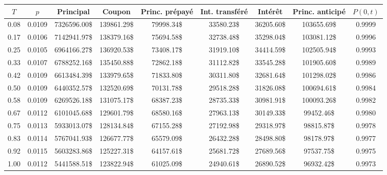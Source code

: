 \begin{tabular}{ccccccccc}
\toprule
       $T$ &          $p$ &          Principal &            Coupon &   Princ. prépayé &   Int. transféré &          Intérêt &   Princ. anticipé &     $P(0,t)$ \\
\midrule
\num{0.08} & \num{0.0109} & \num{7326596.00}\$ & \num{139861.29}\$ & \num{79998.34}\$ & \num{33580.23}\$ & \num{36205.60}\$ & \num{103655.69}\$ & \num{0.9999} \\
\num{0.17} & \num{0.0106} & \num{7142941.97}\$ & \num{138379.16}\$ & \num{75694.58}\$ & \num{32738.48}\$ & \num{35298.04}\$ & \num{103081.12}\$ & \num{0.9996} \\
\num{0.25} & \num{0.0105} & \num{6964166.27}\$ & \num{136920.53}\$ & \num{73408.17}\$ & \num{31919.10}\$ & \num{34414.59}\$ & \num{102505.94}\$ & \num{0.9993} \\
\num{0.33} & \num{0.0107} & \num{6788252.16}\$ & \num{135450.88}\$ & \num{72862.18}\$ & \num{31112.82}\$ & \num{33545.28}\$ & \num{101905.60}\$ & \num{0.9989} \\
\num{0.42} & \num{0.0109} & \num{6613484.39}\$ & \num{133979.65}\$ & \num{71833.80}\$ & \num{30311.80}\$ & \num{32681.64}\$ & \num{101298.02}\$ & \num{0.9986} \\
\num{0.50} & \num{0.0109} & \num{6440352.57}\$ & \num{132520.69}\$ & \num{70131.78}\$ & \num{29518.28}\$ & \num{31826.08}\$ & \num{100694.61}\$ & \num{0.9984} \\
\num{0.58} & \num{0.0109} & \num{6269526.18}\$ & \num{131075.17}\$ & \num{68387.23}\$ & \num{28735.33}\$ & \num{30981.91}\$ & \num{100093.26}\$ & \num{0.9982} \\
\num{0.67} & \num{0.0112} & \num{6101045.68}\$ & \num{129601.79}\$ & \num{68580.16}\$ & \num{27963.13}\$ & \num{30149.33}\$ &  \num{99452.46}\$ & \num{0.9980} \\
\num{0.75} & \num{0.0113} & \num{5933013.07}\$ & \num{128134.84}\$ & \num{67155.28}\$ & \num{27192.98}\$ & \num{29318.97}\$ &  \num{98815.87}\$ & \num{0.9978} \\
\num{0.83} & \num{0.0114} & \num{5767041.93}\$ & \num{126677.77}\$ & \num{65579.09}\$ & \num{26432.28}\$ & \num{28498.80}\$ &  \num{98178.97}\$ & \num{0.9977} \\
\num{0.92} & \num{0.0115} & \num{5603283.86}\$ & \num{125227.31}\$ & \num{64157.61}\$ & \num{25681.72}\$ & \num{27689.56}\$ &  \num{97537.75}\$ & \num{0.9975} \\
\num{1.00} & \num{0.0112} & \num{5441588.51}\$ & \num{123822.94}\$ & \num{61025.09}\$ & \num{24940.61}\$ & \num{26890.52}\$ &  \num{96932.42}\$ & \num{0.9973} \\

\end{tabular}
